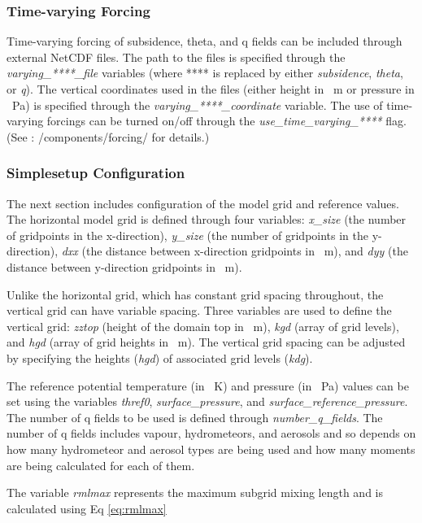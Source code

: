 \subsubsection{Time-varying Forcing} \label{sec:timeVarying}
Time-varying forcing of subsidence, theta, and q fields can be included through external NetCDF files. The path to the files is specified through the \textit{varying\_****\_file} variables (where **** is replaced by either \textit{subsidence}, \textit{theta}, or \textit{q}). The vertical coordinates used in the files (either height in \SI{}{m} or pressure in \SI{}{Pa}) is specified through the \textit{varying\_****\_coordinate} variable. The use of time-varying forcings can be turned on/off through the \textit{use\_time\_varying\_****} flag. (See \cite{moncCode}: /components/forcing/ for details.)
\newpage
\subsubsection{Simplesetup Configuration}
The next section includes configuration of the model grid and reference values. The horizontal model grid is defined through four variables: \textit{x\_size} (the number of gridpoints in the x-direction), \textit{y\_size} (the number of gridpoints in the y-direction), \textit{dxx} (the distance between x-direction gridpoints in \SI{}{m}), and \textit{dyy} (the distance between y-direction gridpoints in \SI{}{m}). 

Unlike the horizontal grid, which has constant grid spacing throughout, the vertical grid can have variable spacing. Three variables are used to define the vertical grid: \textit{zztop} (height of the domain top in \SI{}{m}), \textit{kgd} (array of grid levels), and \textit{hgd} (array of grid heights in \SI{}{m}). The vertical grid spacing can be adjusted by specifying the heights (\textit{hgd}) of associated grid levels (\textit{kdg}). \citep{moncCode}

The reference potential temperature (in \SI{}{K}) and pressure (in \SI{}{Pa}) values can be set using the variables \textit{thref0}, \textit{surface\_pressure}, and \textit{surface\_reference\_pressure}. The number of q fields to be used is defined through \textit{number\_q\_fields}. The number of q fields includes vapour, hydrometeors, and aerosols and so depends on how many hydrometeor and aerosol types are being used and how many moments are being calculated for each of them. \citep{moncCode}

The variable \textit{rmlmax} represents the maximum subgrid mixing length and is calculated using Eq \ref{eq:rmlmax}


